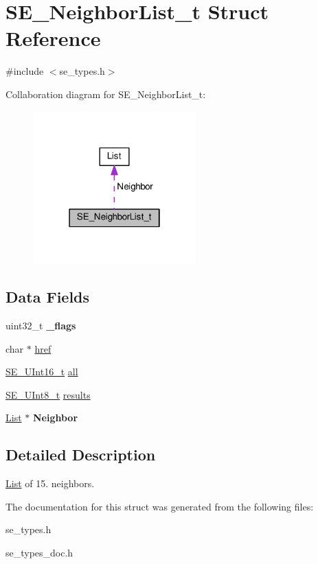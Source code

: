 \hypertarget{structSE__NeighborList__t}{}\section{S\+E\+\_\+\+Neighbor\+List\+\_\+t Struct Reference}
\label{structSE__NeighborList__t}


{\ttfamily \#include $<$se\+\_\+types.\+h$>$}



Collaboration diagram for S\+E\+\_\+\+Neighbor\+List\+\_\+t\+:\nopagebreak
\begin{figure}[H]
\begin{center}
\leavevmode
\includegraphics[width=178pt]{structSE__NeighborList__t__coll__graph}
\end{center}
\end{figure}
\subsection*{Data Fields}
\begin{DoxyCompactItemize}
\item 
uint32\+\_\+t {\bfseries \+\_\+flags}
\item 
char $\ast$ \hyperlink{group__NeighborList_ga971ff14701d973d68a904f70532feb2f}{href}
\item 
\hyperlink{group__UInt16_gac68d541f189538bfd30cfaa712d20d29}{S\+E\+\_\+\+U\+Int16\+\_\+t} \hyperlink{group__NeighborList_ga61ce4f83d73b20a324e57193fea5530a}{all}
\item 
\hyperlink{group__UInt8_gaf7c365a1acfe204e3a67c16ed44572f5}{S\+E\+\_\+\+U\+Int8\+\_\+t} \hyperlink{group__NeighborList_gab0040d876fb53305578656365b0cf0bd}{results}
\item 
\hyperlink{structList}{List} $\ast$ {\bfseries Neighbor}
\end{DoxyCompactItemize}


\subsection{Detailed Description}
\hyperlink{structList}{List} of 15. neighbors. 

The documentation for this struct was generated from the following files\+:\begin{DoxyCompactItemize}
\item 
se\+\_\+types.\+h\item 
se\+\_\+types\+\_\+doc.\+h\end{DoxyCompactItemize}
